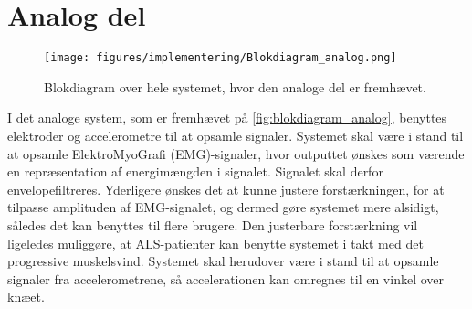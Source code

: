 \section{Analog del} \label{sec:analog_del_krav}

\begin{figure}[H]
\centering
\texttt{[image: figures/implementering/Blokdiagram\_analog.png]}
\caption{Blokdiagram over hele systemet, hvor den analoge del er fremhævet.}
\label{fig:blokdiagram_analog}
\end{figure}

\noindent
I det analoge system, som er fremhævet på \autoref{fig:blokdiagram_analog}, benyttes elektroder og accelerometre til at opsamle signaler. Systemet skal være i stand til at opsamle ElektroMyoGrafi (EMG)-signaler, hvor outputtet ønskes som værende en repræsentation af energimængden i signalet. Signalet skal derfor envelopefiltreres. 
Yderligere ønskes det at kunne justere forstærkningen, for at tilpasse amplituden af EMG-signalet, og dermed gøre systemet mere alsidigt, således det kan benyttes til flere brugere. 
Den justerbare forstærkning vil ligeledes muliggøre, at ALS-patienter kan benytte systemet i takt med det progressive muskelsvind.
Systemet skal herudover være i stand til at opsamle signaler fra accelerometrene, så accelerationen kan omregnes til en vinkel over knæet.
